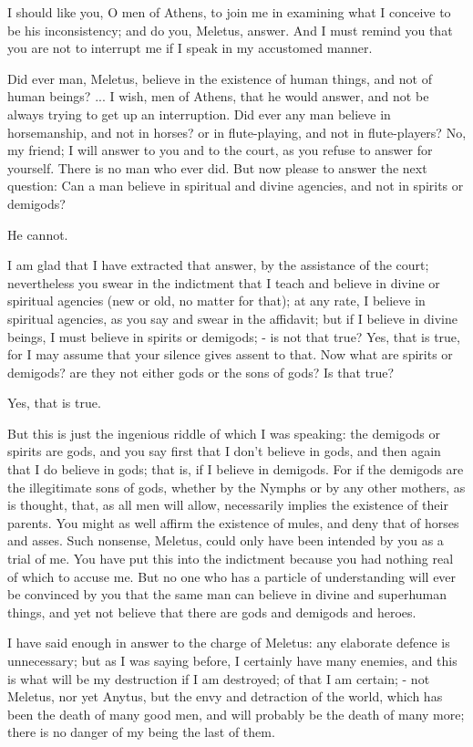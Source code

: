 \documentclass[11pt]{article}
\begin{document}
I should like you, O men of Athens, to join me in examining what I conceive to be his inconsistency; and do you, Meletus, answer. And I must remind you that you are not to interrupt me if I speak in my accustomed manner.

Did ever man, Meletus, believe in the existence of human things, and not of human beings? ... I wish, men of Athens, that he would answer, and not be always trying to get up an interruption. Did ever any man believe in horsemanship, and not in horses? or in flute-playing, and not in flute-players? No, my friend; I will answer to you and to the court, as you refuse to answer for yourself. There is no man who ever did. But now please to answer the next question: Can a man believe in spiritual and divine agencies, and not in spirits or demigods?

He cannot.

I am glad that I have extracted that answer, by the assistance of the court; nevertheless you swear in the indictment that I teach and believe in divine or spiritual agencies (new or old, no matter for that); at any rate, I believe in spiritual agencies, as you say and swear in the affidavit; but if I believe in divine beings, I must believe in spirits or demigods; - is not that true? Yes, that is true, for I may assume that your silence gives assent to that. Now what are spirits or demigods? are they not either gods or the sons of gods? Is that true?

Yes, that is true.

But this is just the ingenious riddle of which I was speaking: the demigods or spirits are gods, and you say first that I don't believe in gods, and then again that I do believe in gods; that is, if I believe in demigods. For if the demigods are the illegitimate sons of gods, whether by the Nymphs or by any other mothers, as is thought, that, as all men will allow, necessarily implies the existence of their parents. You might as well affirm the existence of mules, and deny that of horses and asses. Such nonsense, Meletus, could only have been intended by you as a trial of me. You have put this into the indictment because you had nothing real of which to accuse me. But no one who has a particle of understanding will ever be convinced by you that the same man can believe in divine and superhuman things, and yet not believe that there are gods and demigods and heroes.

I have said enough in answer to the charge of Meletus: any elaborate defence is unnecessary; but as I was saying before, I certainly have many enemies, and this is what will be my destruction if I am destroyed; of that I am certain; - not Meletus, nor yet Anytus, but the envy and detraction of the world, which has been the death of many good men, and will probably be the death of many more; there is no danger of my being the last of them.
\end{document}
